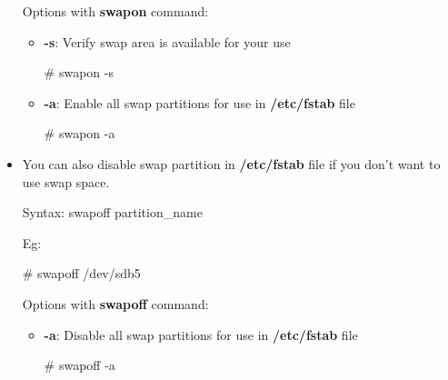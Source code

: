 \begin{flushleft}
\begin{itemize}
	Options with \textbf{swapon} command:
	\begin{itemize}
		\item 	\textbf{-s}: Verify swap area is available for your use
		\bigskip
		\begin{tcolorbox}[breakable,notitle,boxrule=-0pt,colback=black,colframe=black]
			\color{green}
			\font=9pt
			\# swapon -s
			\font=4pt
		\end{tcolorbox}
		\item \textbf{-a}: Enable all swap partitions for use in \textbf{/etc/fstab} file
		\bigskip
		\begin{tcolorbox}[breakable,notitle,boxrule=-0pt,colback=black,colframe=black]
			\color{green}
			\font=9pt
			\# swapon -a
			\font=4pt
		\end{tcolorbox}
		
	\end{itemize}

	\item You can also disable swap partition in \textbf{/etc/fstab} file if you don't want to use swap space.
	\begin{tcolorbox}[breakable,notitle,boxrule=-0pt,colback=pink,colframe=pink]
		\color{black}
		\font=9pt
		Syntax: swapoff partition\_name
		\font=4pt
	\end{tcolorbox}
	
	Eg:
	\begin{tcolorbox}[breakable,notitle,boxrule=-0pt,colback=black,colframe=black]
		\color{green}
		\font=9pt
		\# swapoff /dev/sdb5
		\font=4pt
	\end{tcolorbox}
	
	Options with \textbf{swapoff} command:
	\begin{itemize}
		\item \textbf{-a}: Disable all swap partitions for use in \textbf{/etc/fstab} file
		\bigskip
		\begin{tcolorbox}[breakable,notitle,boxrule=-0pt,colback=black,colframe=black]
			\color{green}
			\font=9pt
			\# swapoff -a
			\font=4pt
		\end{tcolorbox}
		
	\end{itemize}
	
\end{itemize}

	
\end{flushleft}

\newpage

